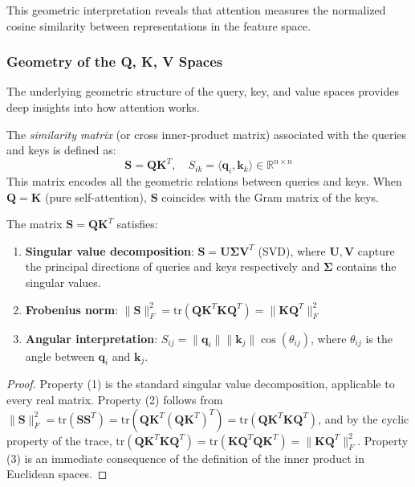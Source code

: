 This geometric interpretation reveals that attention measures the normalized cosine similarity between representations in the feature space.

\subsubsection{Geometry of the Q, K, V Spaces}

The underlying geometric structure of the query, key, and value spaces provides deep insights into how attention works.

\begin{definition}\label{def:gram_metric_attention}
    The \textit{similarity matrix} (or cross inner-product matrix) associated with the queries and keys is defined as:
    \begin{equation}
        \mathbf{S} = \mathbf{Q}\mathbf{K}^T, \quad S_{ik} = \langle \mathbf{q}_i, \mathbf{k}_k \rangle \in \mathbb{R}^{n \times n}
        \label{eq:gram_matrix_attention}
    \end{equation}
    This matrix encodes all the geometric relations between queries and keys. When $\mathbf{Q} = \mathbf{K}$ (pure self-attention), $\mathbf{S}$ coincides with the Gram matrix of the keys.
\end{definition}

\begin{proposition}\label{prop:geometric_properties_gram}
    The matrix $\mathbf{S} = \mathbf{Q}\mathbf{K}^T$ satisfies:
    \begin{enumerate}
        \item \textbf{Singular value decomposition}: $\mathbf{S} = \mathbf{U}\mathbf{\Sigma}\mathbf{V}^T$ (SVD), where $\mathbf{U}, \mathbf{V}$ capture the principal directions of queries and keys respectively and $\mathbf{\Sigma}$ contains the singular values.
        \item \textbf{Frobenius norm}: $\|\mathbf{S}\|_F^2 = \text{tr}(\mathbf{Q}\mathbf{K}^T\mathbf{K}\mathbf{Q}^T) = \|\mathbf{K}\mathbf{Q}^T\|_F^2$
        \item \textbf{Angular interpretation}: $S_{ij} = \|\mathbf{q}_i\|\|\mathbf{k}_j\|\cos(\theta_{ij})$, where $\theta_{ij}$ is the angle between $\mathbf{q}_i$ and $\mathbf{k}_j$.
    \end{enumerate}
\end{proposition}

\begin{proof}
    Property (1) is the standard singular value decomposition, applicable to every real matrix. Property (2) follows from $\|\mathbf{S}\|_F^2 = \text{tr}(\mathbf{S}\mathbf{S}^T) = \text{tr}(\mathbf{Q}\mathbf{K}^T(\mathbf{Q}\mathbf{K}^T)^T) = \text{tr}(\mathbf{Q}\mathbf{K}^T\mathbf{K}\mathbf{Q}^T)$, and by the cyclic property of the trace, $\text{tr}(\mathbf{Q}\mathbf{K}^T\mathbf{K}\mathbf{Q}^T) = \text{tr}(\mathbf{K}\mathbf{Q}^T\mathbf{Q}\mathbf{K}^T) = \|\mathbf{K}\mathbf{Q}^T\|_F^2$. Property (3) is an immediate consequence of the definition of the inner product in Euclidean spaces.
\end{proof}

